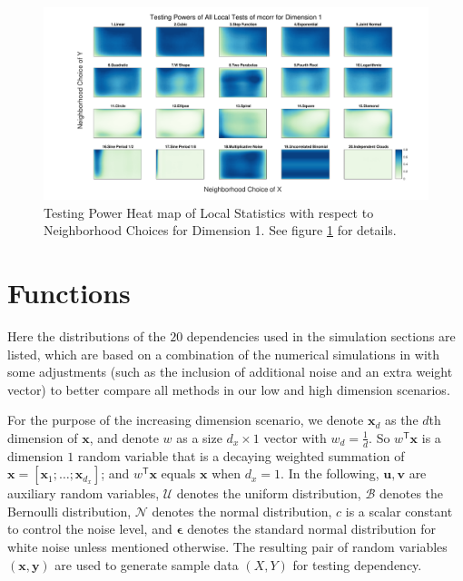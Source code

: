 \documentclass[11pt]{article}
\newcommand{\T}{^{\ensuremath{\mathsf{T}}}}           %
\providecommand{\mb}[1]{\boldsymbol{#1}}
\providecommand{\mc}[1]{\mathcal{#1}}
\newcommand{\jv}[1]{{\color{red}{#1}}}
\newcommand{\cs}[1]{{\color{blue}{#1}}}
\begin{document}
\appendix
\setcounter{figure}{0}
\renewcommand\thefigure{\arabic{figure}} 


\begin{figure}[htbp]
\includegraphics[width=1.0\textwidth]{../Figures/Fig2}
\caption{Testing Power Heat map of Local Statistics with respect to Neighborhood Choices for Dimension 1. See figure \ref{figSim2} for details. \jv{fix (1,1) here too please?}
\cs{do you mean the smallest scale should be at the lowest left corner? it is already the case here. }
}
\label{figSim2}
\end{figure}


\section{Functions}
\label{appen:function}

Here the distributions of the $20$ dependencies used in the simulation sections are listed, which are based on a combination of the numerical simulations in \cite{SzekelyRizzoBakirov2007, SimonTibshirani2012, SimonTibshirani2012, GorfineHellerHeller2012} with some adjustments (such as the inclusion of additional noise and an extra weight vector) to better compare all methods in our low and high dimension scenarios.

For the purpose of the increasing dimension scenario, we denote $\mb{x}_{d}$ as the $d$th dimension of $\mb{x}$, and denote $w$ as a size $d_{x} \times 1$ vector with $w_{d}=\frac{1}{d}$. So $w\T \mb{x}$ is a dimension $1$ random variable that is a decaying weighted summation of $\mb{x}=[\mb{x}_{1};\ldots;\mb{x}_{d_{x}}]$; and $w\T \mb{x}$ equals $\mb{x}$ when $d_{x}=1$. In the following, $\mb{u}, \mb{v}$ are auxiliary random variables, $\mc{U}$ denotes the uniform distribution, $\mc{B}$ denotes the Bernoulli distribution, $\mc{N}$ denotes the normal distribution, $c$ is a scalar constant to control the noise level, and $\mb{\epsilon}$ denotes the standard normal distribution for white noise unless mentioned otherwise. The resulting pair of random variables $(\mb{x},\mb{y})$ are used to generate sample data $(X,Y)$ for testing dependency.
\end{document}
